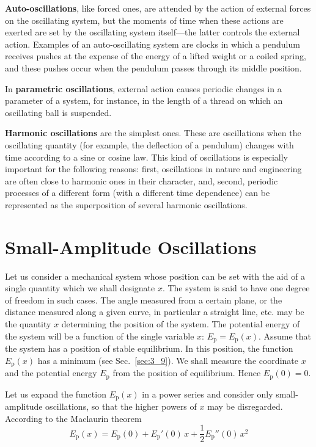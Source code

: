 \textbf{Auto-oscillations}, like forced ones, are attended by the action of external forces on the oscillating system, but the moments of time when these actions are exerted are set by the oscillating system itself---the latter controls the external action. Examples of an auto-oscillating system are clocks in which a pendulum receives pushes at the expense of the energy of a lifted weight or a coiled spring, and these pushes occur when the pendulum passes through its middle position.

In \textbf{parametric oscillations}, external action causes periodic changes in a parameter of a system, for instance, in the length of a thread on which an oscillating ball is suspended.

\textbf{Harmonic oscillations} are the simplest ones. These are oscillations when the oscillating quantity (for example, the deflection of a pendulum) changes with time according to a sine or cosine law. This kind of oscillations is especially important for the following reasons: first, oscillations in nature and engineering are often close to harmonic ones in their character, and, second, periodic processes of a different form (with a different time dependence) can be represented as the superposition of several harmonic oscillations.

\section{Small-Amplitude Oscillations}\label{sec:7_2}

Let us consider a mechanical system whose position can be set with the aid of a single quantity which we shall designate $x$. The system is said to have one degree of freedom in such cases. The angle measured from a certain plane, or the distance measured along a given curve, in particular a straight line, etc. may be the quantity $x$ determining the position of the system. The potential energy of the system will be a function of the single variable $x$: $E_{\text{p}}=E_{\text{p}}(x)$. Assume that the system has a position of stable equilibrium. In this position, the function $E_{\text{p}}(x)$ has a minimum (see Sec.~\ref{sec:3_9}). We shall measure the coordinate $x$ and the potential energy $E_{\text{p}}$ from the position of equilibrium. Hence $E_{\text{p}}(0)=0$. 

Let us expand the function $E_{\text{p}}(x)$ in a power series and consider only small-amplitude oscillations, so that the higher powers of $x$ may be disregarded. According to the Maclaurin theorem
\begin{equation*}
	E_{\text{p}}(x) = E_{\text{p}}(0) + E_{\text{p}}'(0)\,x + \frac{1}{2}E_{\text{p}}''(0)\,x^2
\end{equation*}

